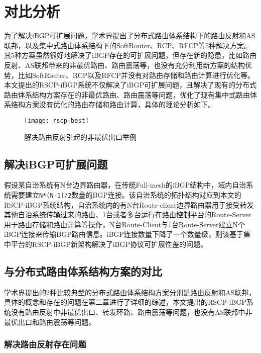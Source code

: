 \section{对比分析}

为了解决iBGP可扩展问题，学术界提出了分布式路由体系结构下的路由反射和AS联邦，以及集中式路由体系结构下的SoftRouter、RCP、RFCP等5种解决方案。其5种方案虽然很好地解决了iBGP存在的可扩展问题，但存在新的隐患，比如路由反射、AS联邦带来的非最优路由、路由震荡等，也没有充分利用新方案的结构优势，比如SoftRouter、RCP以及RFCP并没有对路由存储和路由计算进行优化等。本文提出的RSCP-iBGP系统不仅解决了iBGP可扩展问题，且解决了现有的分布式路由体系结构方案存在的非最优路由、路由震荡等问题，优化了现有集中式路由体系结构方案没有优化的路由存储和路由计算，具体的理论分析如下。

\begin{figure}
  \centering
  \texttt{[image: rscp-best]}
  \caption{解决路由反射引起的非最优出口举例}
  \label{fig:rscp-best}
\end{figure}


\subsection{解决iBGP可扩展问题}

假设某自治系统有N台边界路由器，在传统Full-mesh的iBGP结构中，域内自治系统需要建立\verb+N*(N-1)/2+数量的BGP连接。该自治系统的拓扑结构对应到本文的RSCP-iBGP系统结构，自治系统内的有N台Route-client边界路由器用于接受转发其他自治系统传输过来的路由、1台或者多台运行在路由控制平台的Route-Server用于路由存储和路由计算等操作，N台Route-Client与1台Route-Server建立N个iBGP连接来传输BGP路由信息。iBGP连接数量下降了一个数量级，则该基于集中平台的RSCP-iBGP新架构解决了iBGP协议可扩展性差的问题。

\subsection{与分布式路由体系结构方案的对比}

学术界提出的2种比较典型的分布式路由体系结构方案分别是路由反射和AS联邦，具体的概念和存在的问题在第二章进行了详细的综述，本文提出的RSCP-iBGP系统没有路由反射中非最优出口、转发环路、路由震荡等问题，也没有AS联邦中非最优出口和路由震荡等问题。

\subsubsection{解决路由反射存在问题}



